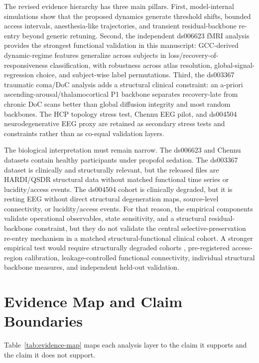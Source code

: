 \documentclass[11pt,a4paper]{article}
\theoremstyle{plain}
\theoremstyle{definition}
\theoremstyle{remark}
\begin{document}
The revised evidence hierarchy has three main pillars. First, model-internal simulations show that the proposed dynamics generate threshold shifts, bounded access intervals, anesthesia-like trajectories, and transient residual-backbone re-entry beyond generic retuning. Second, the independent ds006623 fMRI analysis provides the strongest functional validation in this manuscript: GCC-derived dynamic-regime features generalize across subjects in loss/recovery-of-responsiveness classification, with robustness across atlas resolution, global-signal-regression choice, and subject-wise label permutations. Third, the ds003367 traumatic coma/DoC analysis adds a structural clinical constraint: an a-priori ascending-arousal/thalamocortical P1 backbone separates recovery-late from chronic DoC scans better than global diffusion integrity and most random backbones. The HCP topology stress test, Chennu EEG pilot, and ds004504 neurodegenerative EEG proxy are retained as secondary stress tests and constraints rather than as co-equal validation layers.

The biological interpretation must remain narrow. The ds006623 and Chennu datasets contain healthy participants under propofol sedation. The ds003367 dataset is clinically and structurally relevant, but the released files are HARDI/QSDR structural data without matched functional time series or lucidity/access events. The ds004504 cohort is clinically degraded, but it is resting EEG without direct structural degeneration maps, source-level connectivity, or lucidity/access events. For that reason, the empirical components validate operational observables, state sensitivity, and a structural residual-backbone constraint, but they do not validate the central selective-preservation re-entry mechanism in a matched structural-functional clinical cohort. A stronger empirical test would require structurally degraded cohorts \citep{laureys2004,giacino2014,naccache2018}, pre-registered access-region calibration, leakage-controlled functional connectivity, individual structural backbone measures, and independent held-out validation.

\section{Evidence Map and Claim Boundaries}
\label{sec:evidence-map}

Table~\ref{tab:evidence-map} maps each analysis layer to the claim it supports and the claim it does not support.
\end{document}
